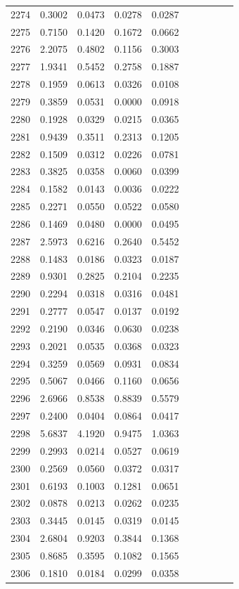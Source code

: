\begin{table}
\begin{tabular}{cccccccccc}
2274& 0.3002& 0.0473& 0.0278& 0.0287\\ 
2275& 0.7150& 0.1420& 0.1672& 0.0662\\ 
2276& 2.2075& 0.4802& 0.1156& 0.3003\\ 
2277& 1.9341& 0.5452& 0.2758& 0.1887\\ 
2278& 0.1959& 0.0613& 0.0326& 0.0108\\ 
2279& 0.3859& 0.0531& 0.0000& 0.0918\\ 
2280& 0.1928& 0.0329& 0.0215& 0.0365\\ 
2281& 0.9439& 0.3511& 0.2313& 0.1205\\ 
2282& 0.1509& 0.0312& 0.0226& 0.0781\\ 
2283& 0.3825& 0.0358& 0.0060& 0.0399\\ 
2284& 0.1582& 0.0143& 0.0036& 0.0222\\ 
2285& 0.2271& 0.0550& 0.0522& 0.0580\\ 
2286& 0.1469& 0.0480& 0.0000& 0.0495\\ 
2287& 2.5973& 0.6216& 0.2640& 0.5452\\ 
2288& 0.1483& 0.0186& 0.0323& 0.0187\\ 
2289& 0.9301& 0.2825& 0.2104& 0.2235\\ 
2290& 0.2294& 0.0318& 0.0316& 0.0481\\ 
2291& 0.2777& 0.0547& 0.0137& 0.0192\\ 
2292& 0.2190& 0.0346& 0.0630& 0.0238\\ 
2293& 0.2021& 0.0535& 0.0368& 0.0323\\ 
2294& 0.3259& 0.0569& 0.0931& 0.0834\\ 
2295& 0.5067& 0.0466& 0.1160& 0.0656\\ 
2296& 2.6966& 0.8538& 0.8839& 0.5579\\ 
2297& 0.2400& 0.0404& 0.0864& 0.0417\\ 
2298& 5.6837& 4.1920& 0.9475& 1.0363\\ 
2299& 0.2993& 0.0214& 0.0527& 0.0619\\ 
2300& 0.2569& 0.0560& 0.0372& 0.0317\\ 
2301& 0.6193& 0.1003& 0.1281& 0.0651\\ 
2302& 0.0878& 0.0213& 0.0262& 0.0235\\ 
2303& 0.3445& 0.0145& 0.0319& 0.0145\\ 
2304& 2.6804& 0.9203& 0.3844& 0.1368\\ 
2305& 0.8685& 0.3595& 0.1082& 0.1565\\ 
2306& 0.1810& 0.0184& 0.0299& 0.0358\\ 

\end{tabular}
\end{table}
